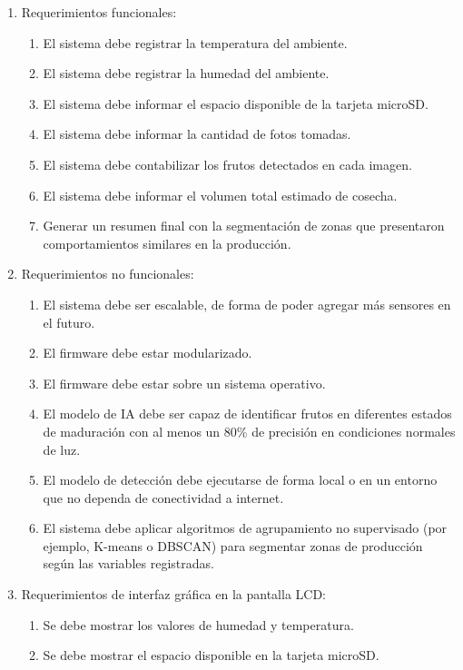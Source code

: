 \documentclass[
11pt, %
]{charter}
\begin{document}
\begin{enumerate}
	\item Requerimientos funcionales:
		\begin{enumerate}
			\item El sistema debe registrar la temperatura del ambiente.
			\item El sistema debe registrar la humedad del ambiente.
			\item El sistema debe informar el espacio disponible de la tarjeta microSD.
            \item El sistema debe informar la cantidad de fotos tomadas.
            \item El sistema debe contabilizar los frutos detectados en cada imagen.
            \item El sistema debe informar el volumen total estimado de cosecha.
            \item Generar un resumen final con la segmentación de zonas que presentaron comportamientos similares en la producción.
		\end{enumerate}
	\item Requerimientos no funcionales:
		\begin{enumerate}
			\item El sistema debe ser escalable, de forma de poder agregar más sensores en el futuro.
			\item El firmware debe estar modularizado.
            \item El firmware debe estar sobre un sistema operativo.
            \item El modelo de IA debe ser capaz de identificar frutos en diferentes estados de maduración con al menos un 80\% de precisión en condiciones normales de luz.
            \item El modelo de detección debe ejecutarse de forma local o en un entorno que no dependa de conectividad a internet.
            \item El sistema debe aplicar algoritmos de agrupamiento no supervisado (por ejemplo, K-means o DBSCAN) para segmentar zonas de producción según las variables registradas.
		\end{enumerate}
    \item Requerimientos de interfaz gráfica en la pantalla LCD:
		\begin{enumerate}
			\item Se debe mostrar los valores de humedad y temperatura.
			\item Se debe mostrar el espacio disponible en la tarjeta microSD.

\end{enumerate}
\end{enumerate}
\end{document}
